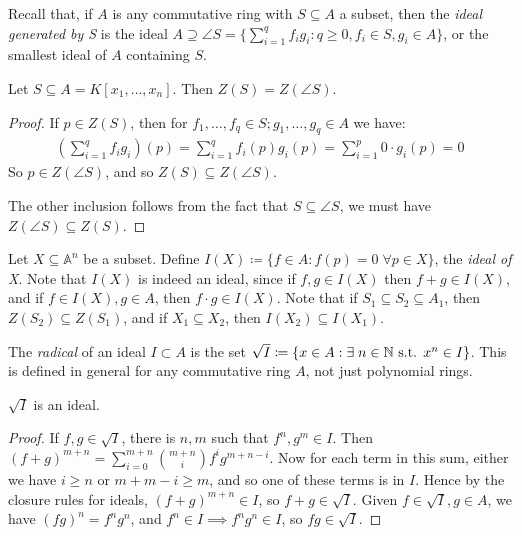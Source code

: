 \documentclass[10pt,a4paper]{article}
\begin{document}
Recall that, if $A$ is any commutative ring with $S \subseteq A$ a subset, then the \emph{ideal generated by S} is the ideal $A \supseteq \angle{S} = \{\sum_{i=1}^q f_ig_i : q \geq 0, f_i \in S, g_i \in A\}$, or the smallest ideal of $A$ containing $S$.

\begin{lemma}
Let $S \subseteq A = K[x_1, \ldots, x_n]$. Then $Z(S) = Z(\angle{S})$.
\end{lemma}
\begin{proof}
If $p \in Z(S)$, then for $f_1, \ldots, f_q \in S; g_1, \ldots, g_q \in A$ we have:
\begin{align*}
\left(\sum_{i=1}^q f_ig_i\right)(p) = \sum_{i=1}^q f_i(p)g_i(p) = \sum_{i=1}^p 0\cdot g_i(p) = 0
\end{align*}
So $p \in Z(\angle{S})$, and so $Z(S)\subseteq Z(\angle{S})$. 

\hspace*{-1em}The other inclusion follows from the fact that $S \subseteq \angle{S}$, we must have $Z(\angle{S}) \subseteq Z(S)$.
\end{proof}

Let $X \subseteq \mathbb{A}^n$ be a subset. Define $I(X) \coloneqq \{f \in A : f(p) = 0 \;\forall p \in X\}$, the \emph{ideal of X}. Note that $I(X)$ is indeed an ideal, since if $f, g \in I(X)$ then $f+g \in I(X)$, and if $f \in I(X), g \in A$, then $f\cdot g \in I(X)$. Note that if $S_1\subseteq S_2 \subseteq A_1$, then $Z(S_2) \subseteq Z(S_1)$, and if $X_1 \subseteq X_2$, then $I(X_2) \subseteq I(X_1)$.

The \emph{radical} of an ideal $I \subset A$ is the set $\sqrt{I} \coloneqq \{x \in A: \exists n\in\N \st x^n \in I\}$. This is defined in general for any commutative ring $A$, not just polynomial rings.

\begin{lemma}
$\sqrt{I}$ is an ideal.
\end{lemma}
\begin{proof}
If $f, g \in \sqrt{I}$, there is $n, m$ such that $f^n, g^m \in I$. Then $(f+g)^{m+n} = \sum_{i=0}^{m+n} \binom{m+n}{i}f^i g^{m+n-i}$. Now for each term in this sum, either we have $i \geq n$ or $m+m-i\geq m$, and so one of these terms is in $I$. Hence by the closure rules for ideals, $(f+g)^{m+n} \in I$, so $f+g \in \sqrt{I}$. Given $f \in \sqrt{I}, g \in A$, we have $(fg)^n = f^n g^n$, and $f^n \in I \implies f^ng^n \in I$, so $fg \in \sqrt{I}$.
\end{proof}
\end{document}
